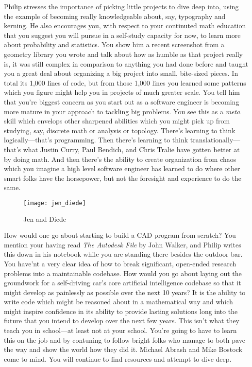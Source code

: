 \documentclass[../main.tex]{subfiles}
\begin{document}
Philip stresses the importance of picking little projects to dive deep into, using the example of becoming really knowledgeable about, say, typography and kerning. He also encourages you, with respect to your continuted math education that you suggest you will pursue in a self-study capacity for now, to learn more about probability and statistics. You show him a recent screenshot from a geometry library you wrote and talk about how as humble as that project really is, it was still complex in comparison to anything you had done before and taught you a great deal about organizing a big project into small, bite-sized pieces. In total its 1,000 lines of code, but from those 1,000 lines you learned some patterns which you figure might help you in projects of much greater scale. You tell him that you're biggest concern as you start out as a software engineer is becoming more mature in your approach to tackling big problems. You see this as a \textit{meta} skill which envelops other sharpened abilities which you might pick up from studying, say, discrete math or analysis or topology. There's learning to think logically---that's programming. Then there's learning to think translationally---that's what Justin Curry, Paul Bendich, and Chris Tralie have gotten better at by doing math. And then there's the ability to create organization from chaos which you imagine a high level software engineer has learned to do where other smart folks have the horsepower, but not the foresight and experience to do the same. 

\begin{figure}[h!]
	\centering
	\texttt{[image: jen\_diede]}
	\caption*{Jen and Diede}
\end{figure}

How would one go about starting to build a CAD program from scratch? You mention your having read \textit{The Autodesk File} by John Walker, and Philip writes this down in his notebook while you are standing there besides the outdoor bar. You have'nt a very clear idea of how to break significant, open-ended research problems into a maintainable codebase. How would you go about laying out the groundwork for a self-driving car's core artificial intelligence codebase so that it might develop as painlessly as possible over the next 10 years? It is the ability to write code which might be reasoned about in a mathematical way and which might inspire confidence in its ability to provide lasting solutions long into the future that you intend to develop over the next few years. This isn't what they teach you in school---at least not at your school. You're going to have to learn this on the job and by contuning to follow bright folks who manage to both pave the way and show the world how they did it. Michael Abrash and Mike Bostock come to mind. You will continue to find resources and attempt to dive deep.
\end{document}
